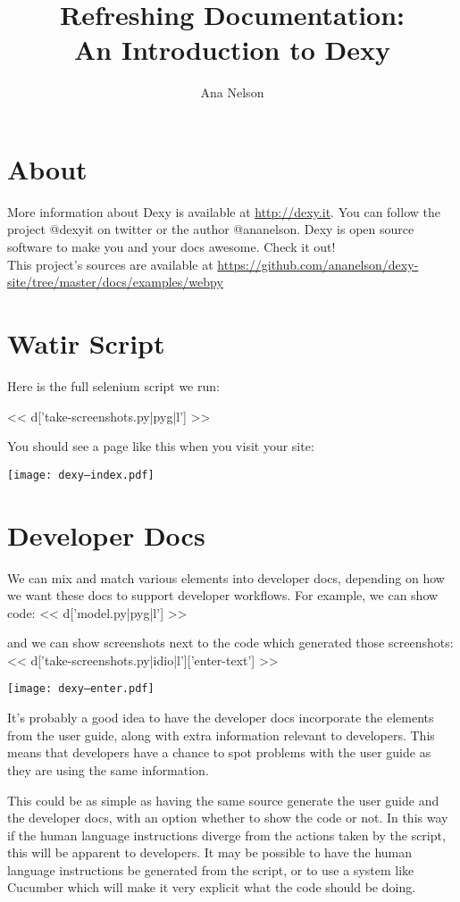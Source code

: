 \documentclass[a4paper]{tufte-handout}
\title{Refreshing Documentation:\\An Introduction to Dexy}
\author{Ana Nelson}
\begin{document}
\maketitle

\section{About}
More information about Dexy is available at \url{http://dexy.it}. You can follow the project @dexyit on twitter or the author @ananelson. Dexy is open source software to make you and your docs awesome. Check it out!
\\This project's sources are available at \url{https://github.com/ananelson/dexy-site/tree/master/docs/examples/webpy}

\section{Watir Script}

Here is the full selenium script we run:

\scriptsize
<< d['take-screenshots.py|pyg|l'] >>
\normalsize

You should see a page like this when you visit your site:

\texttt{[image: dexy--index.pdf]}

\normalfont

\section{Developer Docs}

We can mix and match various elements into developer docs, depending on how we want these docs to support developer workflows. For example, we can show code:
\scriptsize
<< d['model.py|pyg|l'] >>
\normalsize

and we can show screenshots next to the code which generated those screenshots:
\scriptsize
<< d['take-screenshots.py|idio|l']['enter-text'] >>
\normalsize

\texttt{[image: dexy--enter.pdf]}

It's probably a good idea to have the developer docs incorporate the elements from the user guide, along with extra information relevant to developers. This means that developers have a chance to spot problems with the user guide as they are using the same information.

This could be as simple as having the same source generate the user guide and the developer docs, with an option whether to show the code or not. In this way if the human language instructions diverge from the actions taken by the script, this will be apparent to developers. It may be possible to have the human language instructions be generated from the script, or to use a system like Cucumber which will make it very explicit what the code should be doing.
\end{document}
